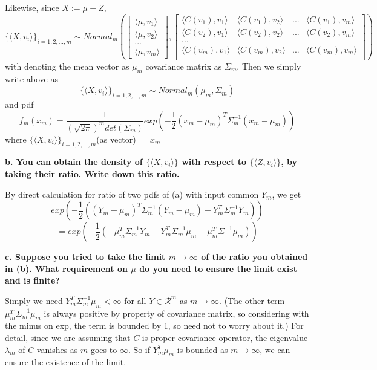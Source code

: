 \documentclass{article}
\begin{document}
Likewise, since $X:=\mu+Z$,
\[\{\langle X, v_i\rangle\}_{i=1,2,...,m} \sim Normal_m(
\begin{bmatrix}
    \langle \mu,v_1 \rangle \\
    \langle \mu,v_2 \rangle \\
    ... \\
    \langle \mu,v_m \rangle
\end{bmatrix}
,
\begin{bmatrix}
    \langle C(v_1),v_1 \rangle & \langle C(v_1),v_2 \rangle & ... & \langle C(v_1),v_m \rangle \\
    \langle C(v_2),v_1 \rangle & \langle C(v_2),v_2 \rangle & ... & \langle C(v_2),v_m \rangle \\
    ... \\
    \langle C(v_m),v_1 \rangle & \langle C(v_m),v_2 \rangle & ... & \langle C(v_m),v_m \rangle \\
\end{bmatrix}
)\]
with denoting the mean vector as $\mu_m$ covariance matrix as $\Sigma_m$. Then we simply write above as
\[\{\langle X, v_i\rangle\}_{i=1,2,...,m} \sim Normal_m(\mu_m,\Sigma_m)\]
and pdf
\[
    f_m(x_m) = \frac{1}{(\sqrt{2\pi})^m det(\Sigma_m)}exp{(-\frac{1}{2}(x_m-\mu_m)^T\Sigma_m^{-1}(x_m-\mu_m))}
\]
where \(\{\langle X, v_i\rangle\}_{i=1,2,...,m}\)(as vector) $=x_m$

\textbf{
b. You can obtain the density of $\{\langle X, v_i\rangle\}$ with respect to $\{\langle Z,v_i \rangle\}$,
by taking their ratio. Write down this ratio.
}

By direct calculation for ratio of two pdfs of (a) with input common $Y_m$, we get
\[exp(-\frac{1}{2}((Y_m-\mu_m)^T\Sigma_m^{-1}(Y_m-\mu_m)-Y_m^T\Sigma_m^{-1}Y_m))\]
\[=exp(-\frac{1}{2}(-\mu_m^T\Sigma_m^{-1}Y_m-Y_m^T\Sigma_m^{-1}\mu_m+\mu_m^T\Sigma^{-1}\mu_m))\]

\textbf{
c. Suppose you tried to take the limit $m \rightarrow \infty$ of the ratio you obtained in (b).
What requirement on $\mu$ do you need to ensure the limit exist and is finite?
}

Simply we need $Y_m^T\Sigma_m^{-1}\mu_m < \infty$ for all $Y\in \mathcal{R}^m$ as $m\rightarrow\infty$.
(The other term $\mu_m^T\Sigma_m^{-1}\mu_m$ is always positive by property of covariance matrix, so considering with the minus on exp,
the term is bounded by 1, so need not to worry about it.)
For detail, since we are assuming that $C$ is proper covariance operator,
the eigenvalue $\lambda_m$ of $C$ vanishes as $m$ goes to $\infty$. So if $Y_m^T\mu_m$ is bounded as $m\rightarrow\infty$,
we can ensure the existence of the limit.
\end{document}
